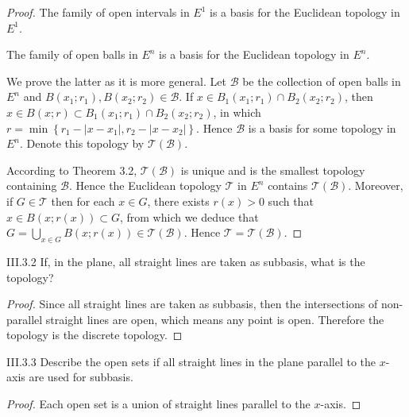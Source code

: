 \begin{proof}
    The family of open intervals in \( E^{1} \) is a basis for the Euclidean topology in \( E^{1} \).

    The family of open balls in \( E^{n} \) is a basis for the Euclidean topology in \( E^{n} \).

    We prove the latter as it is more general. Let \( \mathscr{B} \) be the collection of open balls in \( E^{n} \) and \( B(x_{1}; r_{1}), B(x_{2}; r_{2}) \in \mathscr{B} \). If \( x \in B_{1}(x_{1}; r_{1}) \cap B_{2}(x_{2}; r_{2}) \), then \( x \in B(x; r) \subset B_{1}(x_{1}; r_{1}) \cap B_{2}(x_{2}; r_{2}) \), in which \( r = \min\left\{ r_{1} - \left\vert x - x_{1} \right\vert, r_{2} - \left\vert x - x_{2} \right\vert \right\} \). Hence \( \mathscr{B} \) is a basis for some topology in \( E^{n} \). Denote this topology by \( \mathscr{T}(\mathscr{B}) \).

    According to Theorem 3.2, \( \mathscr{T}(\mathscr{B}) \) is unique and is the smallest topology containing \( \mathscr{B} \). Hence the Euclidean topology \( \mathscr{T} \) in \( E^{n} \) contains \( \mathscr{T}(\mathscr{B}) \). Moreover, if \( G \in \mathscr{T} \) then for each \( x \in G \), there exists \( r(x) > 0 \) such that \( x \in B(x; r(x)) \subset G \), from which we deduce that \( G = \bigcup_{x\in G} B(x; r(x)) \in \mathscr{T}(\mathscr{B}) \). Hence \( \mathscr{T} = \mathscr{T}(\mathscr{B}) \).
\end{proof}

\begin{problem}{III.3.2}
If, in the plane, all straight lines are taken as subbasis, what is the topology?
\end{problem}

\begin{proof}
    Since all straight lines are taken as subbasis, then the intersections of non-parallel straight lines are open, which means any point is open. Therefore the topology is the discrete topology.
\end{proof}

\begin{problem}{III.3.3}
Describe the open sets if all straight lines in the plane parallel to the \(x\)-axis are used for subbasis.
\end{problem}

\begin{proof}
    Each open set is a union of straight lines parallel to the \(x\)-axis.
\end{proof}

